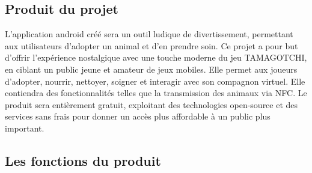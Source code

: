 \documentclass{rapportECL}
\begin{document}
\subsection{Produit du projet}
L’application android créé sera un outil ludique de divertissement, permettant aux utilisateurs d’adopter un animal et d’en prendre soin. Ce projet a pour but d’offrir l’expérience nostalgique avec une touche moderne du jeu TAMAGOTCHI, en ciblant un public jeune et amateur de jeux mobiles. Elle permet aux joueurs d’adopter, nourrir, nettoyer, soigner et interagir avec son compagnon virtuel. Elle contiendra des fonctionnalités telles que la transmission des animaux via NFC. Le produit sera entièrement gratuit, exploitant des technologies open-source et des services sans frais pour donner un accès plus affordable à un public plus important.
\subsection{Les fonctions du produit}
\end{document}
